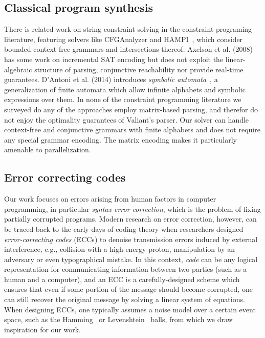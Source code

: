 \documentclass[sigplan,review,anonymous,acmsmall]{acmart}\settopmatter{printfolios=false,printccs=false,printacmref=false}
\begin{document}
  \subsection{Classical program synthesis}

  There is related work on string constraint solving in the constraint programing literature, featuring solvers like CFGAnalyzer and HAMPI~\cite{kiezun2009hampi}, which consider bounded context free grammars and intersections thereof. Axelson et al. (2008)~\cite{axelsson2008analyzing} has some work on incremental SAT encoding but does not exploit the linear-algebraic structure of parsing, conjunctive reachability nor provide real-time guarantees. D'Antoni et al. (2014) introduces \textit{symbolic automata}~\cite{dantoni2014minimization}, a generalization of finite automata which allow infinite alphabets and symbolic expressions over them. In none of the constraint programming literature we surveyed do any of the approaches employ matrix-based parsing, and therefor do not enjoy the optimality guarantees of Valiant's parser. Our solver can handle context-free and conjunctive grammars with finite alphabets and does not require any special grammar encoding. The matrix encoding makes it particularly amenable to parallelization.

  \subsection{Error correcting codes}

  Our work focuses on errors arising from human factors in computer programming, in particular \textit{syntax error correction}, which is the problem of fixing partially corrupted programs. Modern research on error correction, however, can be traced back to the early days of coding theory when researchers designed \textit{error-correcting codes} (ECCs) to denoise transmission errors induced by external interference, e.g., collision with a high-energy proton, manipulation by an adversary or even typographical mistake. In this context, \textit{code} can be any logical representation for communicating information between two parties (such as a human and a computer), and an ECC is a carefully-designed scheme which ensures that even if some portion of the message should become corrupted, one can still recover the original message by solving a linear system of equations. When designing ECCs, one typically assumes a noise model over a certain event space, such as the Hamming~\cite{titsias2017hamming, dong2023number} or Levenshtein~\cite{becerra2008learning, barlev2021levenshtein} balls, from which we draw inspiration for our work.
\end{document}
